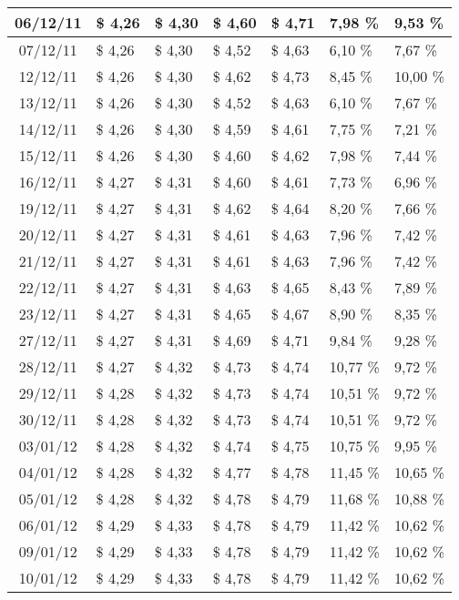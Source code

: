 \begin{center}
\begin{longtable}{|c|p{1.5cm}|p{1.5cm}|p{1.5cm}|p{1.5cm}|p{1.5cm}|p{1.5cm}|}
06/12/11 & \$ 4,26 & \$ 4,30 & \$ 4,60 & \$ 4,71 & 7,98 \% & 9,53 \% \\ \hline
07/12/11 & \$ 4,26 & \$ 4,30 & \$ 4,52 & \$ 4,63 & 6,10 \% & 7,67 \% \\ \hline
12/12/11 & \$ 4,26 & \$ 4,30 & \$ 4,62 & \$ 4,73 & 8,45 \% & 10,00 \% \\ \hline
13/12/11 & \$ 4,26 & \$ 4,30 & \$ 4,52 & \$ 4,63 & 6,10 \% & 7,67 \% \\ \hline
14/12/11 & \$ 4,26 & \$ 4,30 & \$ 4,59 & \$ 4,61 & 7,75 \% & 7,21 \% \\ \hline
15/12/11 & \$ 4,26 & \$ 4,30 & \$ 4,60 & \$ 4,62 & 7,98 \% & 7,44 \% \\ \hline
16/12/11 & \$ 4,27 & \$ 4,31 & \$ 4,60 & \$ 4,61 & 7,73 \% & 6,96 \% \\ \hline
19/12/11 & \$ 4,27 & \$ 4,31 & \$ 4,62 & \$ 4,64 & 8,20 \% & 7,66 \% \\ \hline
20/12/11 & \$ 4,27 & \$ 4,31 & \$ 4,61 & \$ 4,63 & 7,96 \% & 7,42 \% \\ \hline
21/12/11 & \$ 4,27 & \$ 4,31 & \$ 4,61 & \$ 4,63 & 7,96 \% & 7,42 \% \\ \hline
22/12/11 & \$ 4,27 & \$ 4,31 & \$ 4,63 & \$ 4,65 & 8,43 \% & 7,89 \% \\ \hline
23/12/11 & \$ 4,27 & \$ 4,31 & \$ 4,65 & \$ 4,67 & 8,90 \% & 8,35 \% \\ \hline
27/12/11 & \$ 4,27 & \$ 4,31 & \$ 4,69 & \$ 4,71 & 9,84 \% & 9,28 \% \\ \hline
28/12/11 & \$ 4,27 & \$ 4,32 & \$ 4,73 & \$ 4,74 & 10,77 \% & 9,72 \% \\ \hline
29/12/11 & \$ 4,28 & \$ 4,32 & \$ 4,73 & \$ 4,74 & 10,51 \% & 9,72 \% \\ \hline
30/12/11 & \$ 4,28 & \$ 4,32 & \$ 4,73 & \$ 4,74 & 10,51 \% & 9,72 \% \\ \hline
03/01/12 & \$ 4,28 & \$ 4,32 & \$ 4,74 & \$ 4,75 & 10,75 \% & 9,95 \% \\ \hline
04/01/12 & \$ 4,28 & \$ 4,32 & \$ 4,77 & \$ 4,78 & 11,45 \% & 10,65 \% \\ \hline
05/01/12 & \$ 4,28 & \$ 4,32 & \$ 4,78 & \$ 4,79 & 11,68 \% & 10,88 \% \\ \hline
06/01/12 & \$ 4,29 & \$ 4,33 & \$ 4,78 & \$ 4,79 & 11,42 \% & 10,62 \% \\ \hline
09/01/12 & \$ 4,29 & \$ 4,33 & \$ 4,78 & \$ 4,79 & 11,42 \% & 10,62 \% \\ \hline
10/01/12 & \$ 4,29 & \$ 4,33 & \$ 4,78 & \$ 4,79 & 11,42 \% & 10,62 \% \\ \hline

\end{longtable}
\end{center}
